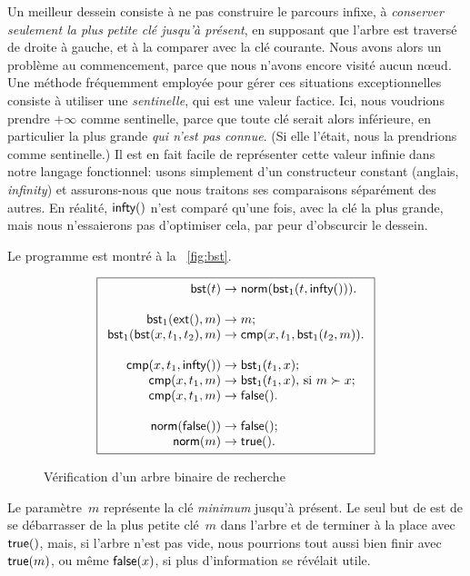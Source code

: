 Un meilleur dessein consiste à ne pas construire le parcours infixe, à
\emph{conserver seulement la plus petite clé jusqu'à présent}, en
supposant que l'arbre est traversé de droite à gauche, et à la
comparer avec la clé courante. Nous avons alors un problème au
commencement, parce que nous n'avons encore visité aucun n{\oe}ud. Une
méthode fréquemment employée pour gérer ces situations exceptionnelles
consiste à utiliser une \emph{sentinelle}, qui est
une valeur factice. Ici, nous voudrions prendre \(+\infty\) comme
sentinelle, parce que toute clé serait alors inférieure, en
particulier la plus grande \emph{qui n'est pas connue}. (Si elle
l'était, nous la prendrions comme sentinelle.) Il est en fait facile
de représenter cette valeur infinie dans notre langage fonctionnel:
usons simplement d'un constructeur constant
 (anglais, \emph{infinity}) et
assurons-nous que nous traitons ses comparaisons séparément des
autres. En réalité, \(\textsf{infty}()\) n'est
comparé qu'une fois, avec la clé la plus grande, mais nous
n'essaierons pas d'optimiser cela, par peur d'obscurcir le dessein.

Le programme est montré à la
\fig~\vref{fig:bst}.
\begin{figure}[t]
\begin{equation*}
\boxed{
\begin{array}{r@{\;}l@{\;}l}
  \fun{bst}(t) & \rightarrow & \fun{norm}(\fun{bst}_1(t,\fun{infty}())).\\
  \\
  \fun{bst}_1(\fun{ext}(),m) & \rightarrow & m;\\
  \fun{bst}_1(\fun{bst}(x,t_1,t_2),m) & \rightarrow &
  \fun{cmp}(x,t_1,\fun{bst}_1(t_2,m)).\\
\\
\fun{cmp}(x,t_1,\fun{infty}()) & \rightarrow & \fun{bst}_1(t_1,x);\\
\fun{cmp}(x,t_1,m) & \rightarrow &
  \fun{bst}_1(t_1,x), \,\text{si \(m \succ x\)};\\
\fun{cmp}(x,t_1,m) & \rightarrow & \fun{false}().\\
\\
\fun{norm}(\fun{false}()) & \rightarrow & \fun{false}();\\
\fun{norm}(m) & \rightarrow & \fun{true}().
\end{array}}
\end{equation*}
\caption{Vérification d'un arbre binaire de recherche\label{fig:bst}}
\end{figure}
Le paramètre~\(m\) représente la clé \emph{minimum} jusqu'à
présent. Le seul but de  est de
se débarrasser de la plus petite clé~\(m\) dans l'arbre et de terminer
à la place avec \(\textsf{true}()\), mais, si l'arbre n'est pas vide,
nous pourrions tout aussi bien finir avec \(\textsf{true}(m)\), ou même
\(\textsf{false}(x)\), si plus d'information se révélait
utile.

